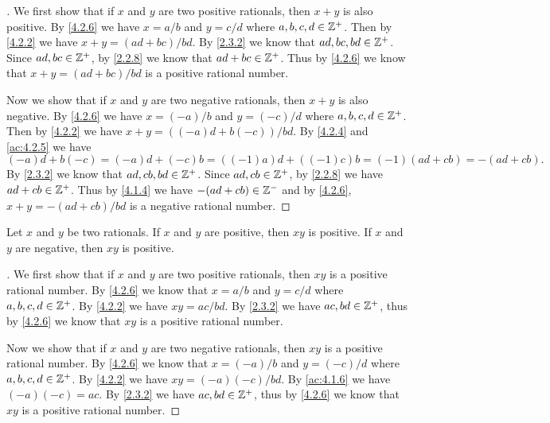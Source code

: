 \begin{proof}[]
  We first show that if \(x\) and \(y\) are two positive rationals, then \(x + y\) is also positive.
  By \cref{4.2.6} we have \(x = a / b\) and \(y = c / d\) where \(a, b, c, d \in \mathbb{Z}^+\).
  Then by \cref{4.2.2} we have \(x + y = (ad + bc) / bd\).
  By \cref{2.3.2} we know that \(ad, bc, bd \in \mathbb{Z}^+\).
  Since \(ad, bc \in \mathbb{Z}^+\), by \cref{2.2.8} we know that \(ad + bc \in \mathbb{Z}^+\).
  Thus by \cref{4.2.6} we know that \(x + y = (ad + bc) / bd\) is a positive rational number.

  Now we show that if \(x\) and \(y\) are two negative rationals, then \(x + y\) is also negative.
  By \cref{4.2.6} we have \(x = (-a) / b\) and \(y = (-c) / d\) where \(a, b, c, d \in \mathbb{Z}^+\).
  Then by \cref{4.2.2} we have \(x + y = ((-a)d + b(-c)) / bd\).
  By \cref{4.2.4} and \cref{ac:4.2.5} we have
  \[
    (-a)d + b(-c) = (-a)d + (-c)b = ((-1)a)d + ((-1)c)b = (-1)(ad + cb) = -(ad + cb).
  \]
  By \cref{2.3.2} we know that \(ad, cb, bd \in \mathbb{Z}^+\).
  Since \(ad, cb \in \mathbb{Z}^+\), by \cref{2.2.8} we have \(ad + cb \in \mathbb{Z}^+\).
  Thus by \cref{4.1.4} we have \(-(ad + cb) \in \mathbb{Z}^-\) and by \cref{4.2.6}, \(x + y = -(ad + cb) / bd\) is a negative rational number.
\end{proof}

\begin{ac}\label{ac:4.2.7}
  Let \(x\) and \(y\) be two rationals.
  If \(x\) and \(y\) are positive, then \(xy\) is positive.
  If \(x\) and \(y\) are negative, then \(xy\) is positive.
\end{ac}

\begin{proof}[]
  We first show that if \(x\) and \(y\) are two positive rationals, then \(xy\) is a positive rational number.
  By \cref{4.2.6} we know that \(x = a / b\) and \(y = c / d\) where \(a, b, c, d \in \mathbb{Z}^+\).
  By \cref{4.2.2} we have \(xy = ac / bd\).
  By \cref{2.3.2} we have \(ac, bd \in \mathbb{Z}^+\), thus by \cref{4.2.6} we know that \(xy\) is a positive rational number.

  Now we show that if \(x\) and \(y\) are two negative rationals, then \(xy\) is a positive rational number.
  By \cref{4.2.6} we know that \(x = (-a) / b\) and \(y = (-c) / d\) where \(a, b, c, d \in \mathbb{Z}^+\).
  By \cref{4.2.2} we have \(xy = (-a)(-c) / bd\).
  By \cref{ac:4.1.6} we have \((-a)(-c) = ac\).
  By \cref{2.3.2} we have \(ac, bd \in \mathbb{Z}^+\), thus by \cref{4.2.6} we know that \(xy\) is a positive rational number.
\end{proof}

